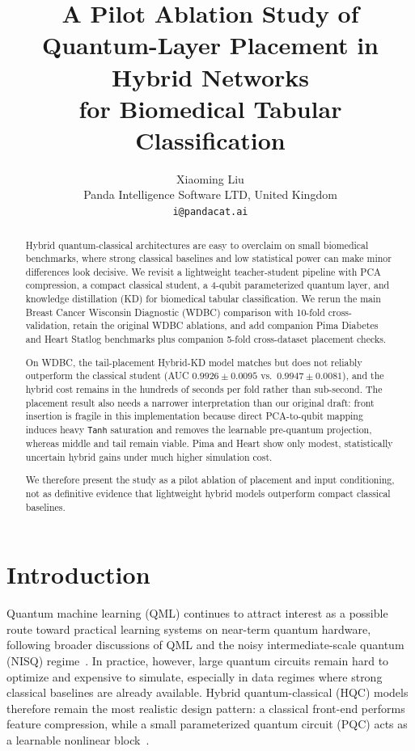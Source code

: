 \documentclass[11pt,a4paper]{article}
\title{A Pilot Ablation Study of Quantum-Layer Placement in Hybrid Networks\\
for Biomedical Tabular Classification}
\author{Xiaoming Liu\\
Panda Intelligence Software LTD, United Kingdom\\
\texttt{i@pandacat.ai}}
\date{}
\begin{document}
\maketitle

\begin{abstract}
Hybrid quantum-classical architectures are easy to overclaim on small biomedical benchmarks, where
strong classical baselines and low statistical power can make minor differences look decisive. We
revisit a lightweight teacher-student pipeline with PCA compression, a compact classical student, a
4-qubit parameterized quantum layer, and knowledge distillation (KD) for biomedical tabular
classification. We rerun the main Breast Cancer Wisconsin Diagnostic (WDBC) comparison with
10-fold cross-validation, retain the original WDBC ablations, and add companion Pima Diabetes and
Heart Statlog benchmarks plus companion 5-fold cross-dataset placement checks.

On WDBC, the tail-placement Hybrid-KD model matches but does not reliably outperform the classical
student (AUC $0.9926 \pm 0.0095$ vs.\ $0.9947 \pm 0.0081$), and the hybrid cost remains in the
hundreds of seconds per fold rather than sub-second. The placement result also needs a narrower
interpretation than our original draft: front insertion is fragile in this implementation because
direct PCA-to-qubit mapping induces heavy \texttt{Tanh} saturation and removes the learnable
pre-quantum projection, whereas middle and tail remain viable. Pima and Heart show only modest,
statistically uncertain hybrid gains under much higher simulation cost.

We therefore present the study as a pilot ablation of placement and input conditioning, not as
definitive evidence that lightweight hybrid models outperform compact classical baselines.
\end{abstract}

\section{Introduction}
\label{sec:intro}

Quantum machine learning (QML) continues to attract interest as a possible route toward practical
learning systems on near-term quantum hardware, following broader discussions of QML and the noisy
intermediate-scale quantum (NISQ) regime~\cite{biamonte2017qml,preskill2018nisq,cerezo2021vqa,schuld2021machine}.
In practice, however, large quantum circuits remain hard to optimize and expensive to simulate,
especially in data regimes where strong classical baselines are already available. Hybrid
quantum-classical (HQC) models therefore remain the most realistic design pattern: a classical
front-end performs feature compression, while a small parameterized quantum circuit (PQC) acts as a
learnable nonlinear block~\cite{cerezo2021vqa,benedetti2019pqc}.
\end{document}

